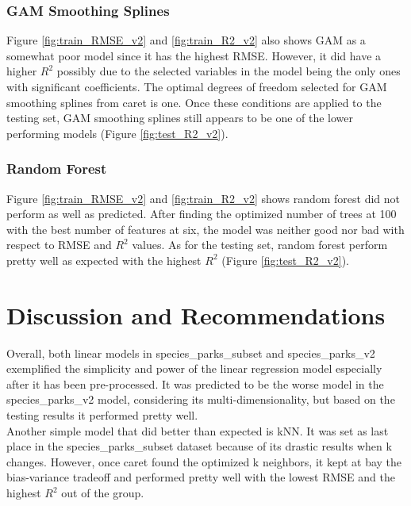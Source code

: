 \documentclass[stu, floatsintext, 11pt]{apa7}
\begin{document}
\subsubsection{GAM Smoothing Splines}
Figure \ref{fig:train_RMSE_v2} and \ref{fig:train_R2_v2} also shows GAM as a somewhat poor model since it has the highest RMSE. However, it did have a higher $R^2$ possibly due to the selected variables in the model being the only ones with significant coefficients. The optimal degrees of freedom selected for GAM smoothing splines from caret is one. Once these conditions are applied to the testing set, GAM smoothing splines still appears to be one of the lower performing models (Figure \ref{fig:test_R2_v2}).

\subsubsection{Random Forest}
Figure \ref{fig:train_RMSE_v2} and \ref{fig:train_R2_v2} shows random forest did not perform as well as predicted. After finding the optimized number of trees at 100 with the best number of features at six, the model was neither good nor bad with respect to RMSE and $R^2$ values. As for the testing set, random forest perform pretty well as expected with the highest $R^2$ (Figure \ref{fig:test_R2_v2}).

\section{Discussion and Recommendations}
Overall, both linear models in species\_parks\_subset and species\_parks\_v2 exemplified the simplicity and power of the linear regression model especially after it has been pre-processed. It was predicted to be the worse model in the species\_parks\_v2 model, considering its multi-dimensionality, but based on the testing results it performed pretty well. \\

Another simple model that did better than expected is kNN. It was set as last place in the species\_parks\_subset dataset because of its drastic results when k changes. However, once caret found the optimized k neighbors, it kept at bay the bias-variance tradeoff and performed pretty well with the lowest RMSE and the highest $R^2$ out of the group. \\
\end{document}
